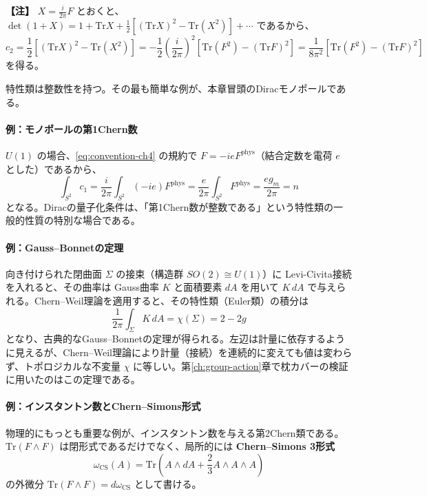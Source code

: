 \documentclass[uplatex, dvipdfmx, book]{jsbook}
\newenvironment{note}{\vspace{1ex}\par\footnotesize\noindent\textbf{【注】}}{\par\vspace{1ex}}
\begin{document}
\begin{note}
$X = \frac{i}{2\pi}F$ とおくと、$\det(1 + X) = 1 + \mathrm{Tr}X + \frac{1}{2}\left[ (\mathrm{Tr}X)^2 - \mathrm{Tr}(X^2) \right] + \cdots$ であるから、
\begin{equation*}
    c_2 = \frac{1}{2}\left[ (\mathrm{Tr}X)^2 - \mathrm{Tr}(X^2) \right] = -\frac{1}{2}\left(\frac{i}{2\pi}\right)^2 \left[ \mathrm{Tr}(F^2) - (\mathrm{Tr}F)^2 \right] = \frac{1}{8\pi^2}\left[ \mathrm{Tr}(F^2) - (\mathrm{Tr}F)^2 \right]
\end{equation*}
を得る。
\end{note}

特性類は整数性を持つ。その最も簡単な例が、本章冒頭のDiracモノポールである。

\paragraph{例：モノポールの第1Chern数}
$U(1)$ の場合、\eqref{eq:convention-ch4} の規約で $F = -ie F^{\text{phys}}$（結合定数を電荷 $e$ とした）であるから、
\begin{equation}
    \int_{S^2} c_1 = \frac{i}{2\pi}\int_{S^2} (-ie) F^{\text{phys}} = \frac{e}{2\pi}\int_{S^2} F^{\text{phys}} = \frac{e g_m}{2\pi} = n
\end{equation}
となる。Diracの量子化条件は、「第1Chern数が整数である」という特性類の一般的性質の特別な場合である。

\paragraph{例：Gauss--Bonnetの定理}
向き付けられた閉曲面 $\Sigma$ の接束（構造群 $SO(2) \cong U(1)$）に Levi-Civita接続を入れると、その曲率は Gauss曲率 $K$ と面積要素 $dA$ を用いて $K\, dA$ で与えられる。Chern--Weil理論を適用すると、その特性類（Euler類）の積分は
\begin{equation}
    \frac{1}{2\pi}\int_\Sigma K\, dA = \chi(\Sigma) = 2 - 2g
\end{equation}
となり、古典的なGauss--Bonnetの定理が得られる。左辺は計量に依存するように見えるが、Chern--Weil理論により計量（接続）を連続的に変えても値は変わらず、トポロジカルな不変量 $\chi$ に等しい。第\ref{ch:group-action}章で枕カバーの検証に用いたのはこの定理である。

\paragraph{例：インスタントン数とChern--Simons形式}
物理的にもっとも重要な例が、インスタントン数を与える第2Chern類である。$\mathrm{Tr}(F \wedge F)$ は閉形式であるだけでなく、局所的には \textbf{Chern--Simons 3形式}
\begin{equation}
    \omega_{\text{CS}}(A) = \mathrm{Tr}\left( A \wedge dA + \frac{2}{3} A \wedge A \wedge A \right)
\end{equation}
の外微分 $\mathrm{Tr}(F \wedge F) = d\omega_{\text{CS}}$ として書ける。
\end{document}
